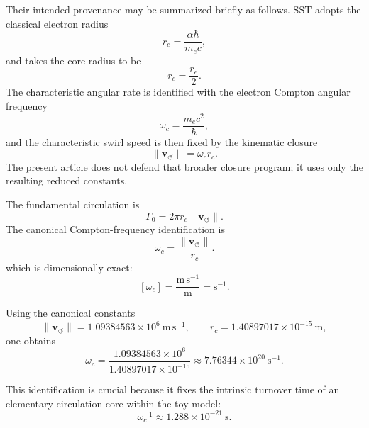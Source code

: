 \documentclass[11pt]{article}
\newcommand{\vnorm}{\lVert \mathbf{v}_{\!\boldsymbol{\circlearrowleft}}\rVert}
\newcommand{\rc}{r_c}
\newcommand{\Gammazero}{\Gamma_0}
\begin{document}
        Their intended provenance may be summarized briefly as follows. SST adopts the classical electron radius
        \begin{equation}
            r_e=\frac{\alpha\hbar}{m_e c},
        \end{equation}
        and takes the core radius to be
        \begin{equation}
            \rc=\frac{r_e}{2}.
        \end{equation}
        The characteristic angular rate is identified with the electron Compton angular frequency
        \begin{equation}
            \omega_c=\frac{m_e c^2}{\hbar},
        \end{equation}
        and the characteristic swirl speed is then fixed by the kinematic closure
        \begin{equation}
            \vnorm=\omega_c \rc.
        \end{equation}
        The present article does not defend that broader closure program; it uses only the resulting reduced constants.

        The fundamental circulation is
        \begin{equation}
            \Gammazero=2\pi \rc \vnorm.
        \end{equation}
        The canonical Compton-frequency identification is
        \begin{equation}
            \omega_c=\frac{\vnorm}{\rc}.
            \label{eq:omega_c}
        \end{equation}
        which is dimensionally exact:
        \[
            [\omega_c]=\frac{\mathrm{m\,s^{-1}}}{\mathrm{m}}=\mathrm{s^{-1}}.
        \]
        
        Using the canonical constants
        \[
            \vnorm=1.09384563\times 10^6\ \mathrm{m\,s^{-1}},
            \qquad
            \rc=1.40897017\times 10^{-15}\ \mathrm{m},
        \]
        one obtains
        \begin{equation}
            \omega_c
            =
            \frac{1.09384563\times 10^6}{1.40897017\times 10^{-15}}
            \approx 7.76344\times 10^{20}\ \mathrm{s^{-1}}.
            \label{eq:omega_c_num}
        \end{equation}
        
        This identification is crucial because it fixes the intrinsic turnover time of an elementary circulation core within the toy model:
        \begin{equation}
            \omega_c^{-1}\approx 1.288\times 10^{-21}\ \mathrm{s}.
        \end{equation}
    
\end{document}
